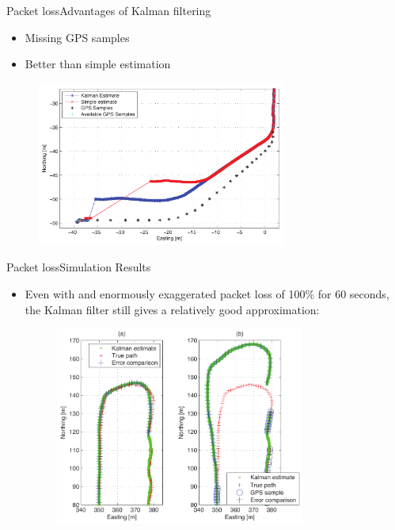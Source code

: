 \documentclass[10pt]{beamer}
\begin{document}

	\begin{frame}{Packet loss}{Advantages of Kalman filtering}
		\begin{itemize}
			\item Missing GPS samples
			\item Better than simple estimation 
		\end{itemize}
		\begin{figure}
			\begin{center}
				\includegraphics[width=8.2cm]{img/kalmanestimate}
				\label{fig:kalmanestimate}
			\end{center}
		\end{figure}
	\end{frame}
		

	\begin{frame}{Packet loss}{Simulation Results}
	  \begin{itemize}
	  	\item Even with and enormously exaggerated packet loss of 100\% for 60 seconds, the Kalman filter still gives a relatively good approximation:
		\begin{figure}
			\begin{center}
				\includegraphics[width=8.2cm]{img/track}
				\label{fig:packetloss}
			\end{center}
		\end{figure}
	  \end{itemize}
	\end{frame}
\end{document}

